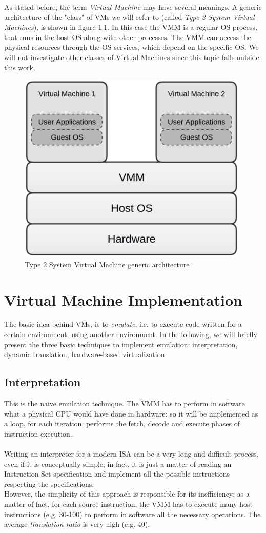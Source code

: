 \documentclass[a4paper, 12pt, titlepage]{report}
\begin{document}
As stated before, the term \textit{Virtual Machine} may have several meanings. A generic architecture of the "class" of VMs we will refer to (called \textit{Type 2 System Virtual Machines}), is shown in figure 1.1. In this case the VMM is a regular OS process, that runs in the host OS along with other processes. The VMM can access the physical resources through the OS services, which depend on the specific OS. We will not investigate other classes of Virtual Machines since this topic falls outside this work. 
\begin{figure}[!h]
	\centering
	\includegraphics[scale=0.5]{img/vm_arch.png}
	\caption{Type 2 System Virtual Machine generic architecture}
\end{figure}

\section{Virtual Machine Implementation}
The basic idea behind VMs, is to \textit{emulate}, i.e. to execute code written for a certain environment, using another environment. In the following, we will briefly present the three basic techniques to implement emulation: interpretation, dynamic translation, hardware-based virtualization.
\subsection{Interpretation}
This is the naive emulation technique. The VMM has to perform in software what a physical CPU would have done in hardware: so it will be implemented as a loop, for each iteration, performs  the fetch, decode and execute phases of instruction execution.
\\
\\
Writing an interpreter for a modern ISA can be a very long and difficult process, even if it is conceptually simple; in fact, it is just a matter of reading an Instruction Set specification and implement all the possible instructions respecting the specifications.\\
However, the simplicity of this approach is responsible for its inefficiency; as a matter of fact, for each source instruction, the VMM has to execute many host instructions (e.g. 30-100) to perform in software all the necessary operations. The average \textit{translation ratio} is very high (e.g. 40).
\end{document}
